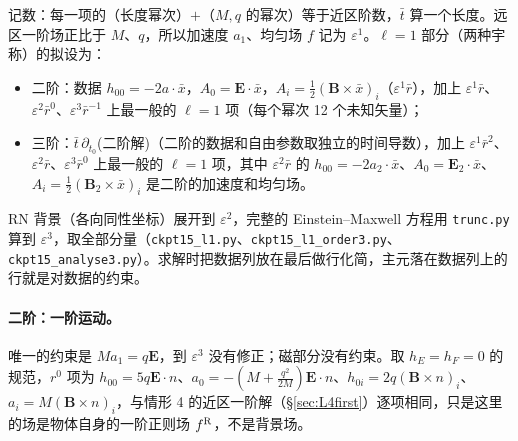 \documentclass[11pt,a4paper]{ctexart}
\numberwithin{equation}{section}
\begin{document}
记数：每一项的（长度幂次）$+$（$M,q$ 的幂次）等于近区阶数，$\bar t$ 算一个长度。远区一阶场正比于 $M$、$q$，所以加速度 $a_1$、均匀场 $f$ 记为 $\varepsilon^1$。$\ell=1$ 部分（两种宇称）的拟设为：
\begin{itemize}
\item 二阶：数据 $h_{00}=-2a\cdot\bar x$，$A_0=\boldsymbol E\cdot\bar x$，$A_i=\tfrac12(\boldsymbol B\times\bar x)_i$（$\varepsilon^1\bar r$），加上 $\varepsilon^1\bar r$、$\varepsilon^2\bar r^0$、$\varepsilon^3\bar r^{-1}$ 上最一般的 $\ell=1$ 项（每个幂次 12 个未知矢量）；
\item 三阶：$\bar t\,\partial_{t_0}$(二阶解)（二阶的数据和自由参数取独立的时间导数），加上 $\varepsilon^1\bar r^2$、$\varepsilon^2\bar r$、$\varepsilon^3\bar r^0$ 上最一般的 $\ell=1$ 项，其中 $\varepsilon^2\bar r$ 的 $h_{00}=-2a_2\cdot\bar x$、$A_0=\boldsymbol E_2\cdot\bar x$、$A_i=\tfrac12(\boldsymbol B_2\times\bar x)_i$ 是二阶的加速度和均匀场。
\end{itemize}
RN 背景（各向同性坐标）展开到 $\varepsilon^2$，完整的 Einstein--Maxwell 方程用 \texttt{trunc.py} 算到 $\varepsilon^3$，取全部分量（\texttt{ckpt15\_l1.py}、\texttt{ckpt15\_l1\_order3.py}、\texttt{ckpt15\_analyse3.py}）。求解时把数据列放在最后做行化简，主元落在数据列上的行就是对数据的约束。

\paragraph{二阶：一阶运动。}唯一的约束是 $Ma_1=q\boldsymbol E$，到 $\varepsilon^3$ 没有修正；磁部分没有约束。取 $h_E=h_F=0$ 的规范，$r^0$ 项为 $h_{00}=5q\boldsymbol E\cdot n$、$a_0=-(M+\tfrac{q^2}{2M})\boldsymbol E\cdot n$、$h_{0i}=2q(\boldsymbol B\times n)_i$、$a_i=M(\boldsymbol B\times n)_i$，与情形 4 的近区一阶解（\S\ref{sec:L4first}）逐项相同，只是这里的场是物体自身的一阶正则场 $f^{\rm R}$，不是背景场。
\end{document}
